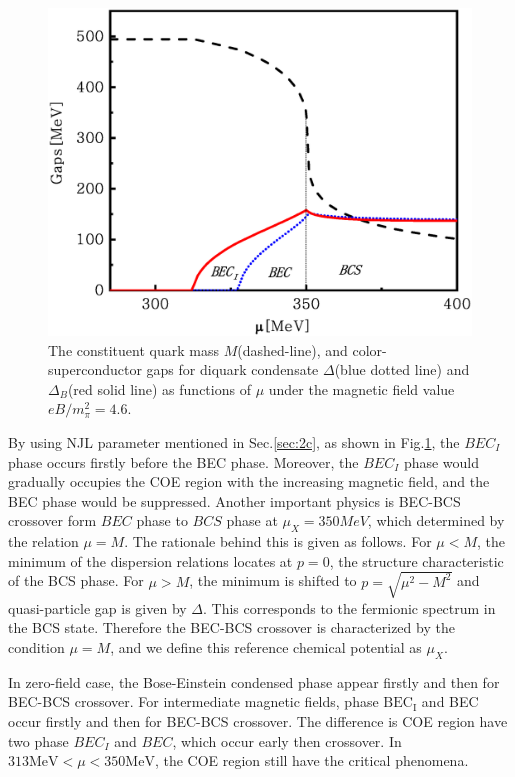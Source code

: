 \documentclass[prd, showpacs,nofootinbib,amsmath,amssymb,12pt]{revtex4}
\begin{document}
\begin{figure}[ht]
	\centering
	\includegraphics[scale=0.3]{1.eps}
	\caption{The constituent quark mass $M$(dashed-line), and color-superconductor gaps for diquark condensate $\Delta$(blue dotted line) and $\Delta_B$(red solid line) as functions of $\mu$ under the magnetic field value $eB/m^2_\pi=4.6$.}
	\label{f2}
\end{figure}

By using NJL parameter mentioned in Sec.\ref{sec:2c}, as shown in Fig.\ref{f2}, the $BEC_I$ phase occurs firstly before the BEC phase.
Moreover, the $BEC_I$ phase would gradually occupies the COE region with the increasing magnetic field, 
and the BEC phase would be suppressed.
Another important physics is BEC-BCS crossover form $BEC$ phase to $BCS$ phase at $\mu_X = 350 MeV$,  
which determined by the  relation $\mu = M$.
The rationale behind this is given as follows.
For $\mu<M$, the minimum of the dispersion relations locates at $p=0$, the structure characteristic of the BCS phase.
For $\mu > M$, the minimum is shifted to $p = \sqrt{\mu^2-M^2}$ and quasi-particle gap is given by $\Delta$.
This corresponds to the fermionic spectrum in the BCS state.
Therefore the BEC-BCS crossover  is characterized by the condition $\mu =M$, and we define this reference chemical potential as $\mu_X$.

In zero-field case, 
the Bose-Einstein condensed phase appear firstly and then for BEC-BCS crossover.
For intermediate magnetic fields,  phase $\text{BEC}_\text{I}$ and BEC occur firstly and then for
 BEC-BCS crossover.
The difference is COE region have two phase $BEC_I$ and $BEC$, which occur early then crossover.
In  $313 \text{MeV} <\mu <350 \text{MeV}$, the COE region still have the critical phenomena.
\end{document}
